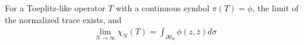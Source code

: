 \documentclass[10pt,a4paper]{amsart}
\begin{document}
\begin{proposition}
   For a Toeplitz-like operator $T$ with a continuous symbol $\pi(T)=\phi$,
   the limit of the normalized trace exists, and 
   \begin{align*}
   \lim _{N \rightarrow \infty} \chi_N(T) = \int_{\partial \mathbb{B}_d} \phi(z,\bar{z})d\sigma
    \end{align*}
\end{proposition}
\end{document}
